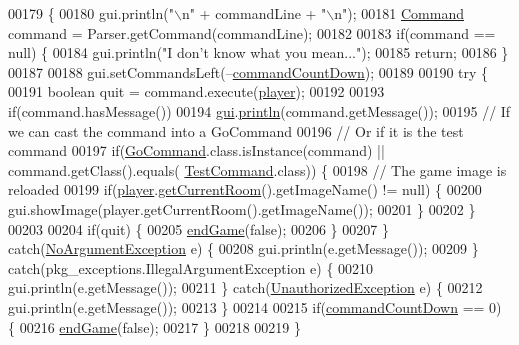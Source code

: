 \begin{DoxyCode}
00179                                                    \{
00180         gui.println(\textcolor{stringliteral}{"\(\backslash\)n"} + commandLine + \textcolor{stringliteral}{"\(\backslash\)n"});
00181         \hyperlink{classpkg__commands_1_1Command}{Command} command = Parser.getCommand(commandLine);
00182 
00183         \textcolor{keywordflow}{if}(command == null) \{
00184             gui.println(\textcolor{stringliteral}{"I don't know what you mean..."});
00185             \textcolor{keywordflow}{return};
00186         \}
00187 
00188         gui.setCommandsLeft(--\hyperlink{classGameEngine_ad4ff8d760eced9c7b76cdeb0dc989975}{commandCountDown});
00189 
00190         \textcolor{keywordflow}{try} \{
00191             \textcolor{keywordtype}{boolean} quit = command.execute(\hyperlink{classGameEngine_a4666c6719428cc43014b30b305eeef5d}{player});
00192 
00193             \textcolor{keywordflow}{if}(command.hasMessage())
00194                 \hyperlink{classGameEngine_a2a7d0bb6183b3f3ef3ee2008926374a0}{gui}.\hyperlink{classUserInterface_a79f606b4b1f5d1523e50eea00039ed94}{println}(command.getMessage());
00195             \textcolor{comment}{// If we can cast the command into a GoCommand}
00196             \textcolor{comment}{// Or if it is the test command}
00197             \textcolor{keywordflow}{if}(\hyperlink{classpkg__commands_1_1GoCommand}{GoCommand}.class.isInstance(command) || command.getClass().equals(
      \hyperlink{classpkg__commands_1_1TestCommand}{TestCommand}.class)) \{
00198                 \textcolor{comment}{// The game image is reloaded}
00199                 \textcolor{keywordflow}{if}(\hyperlink{classGameEngine_a4666c6719428cc43014b30b305eeef5d}{player}.\hyperlink{classpkg__world_1_1Player_a5ff0ede152d97c0c9cf6603c9a422a77}{getCurrentRoom}().getImageName() != null) \{
00200                     gui.showImage(player.getCurrentRoom().getImageName());
00201                 \}
00202             \}
00203 
00204             \textcolor{keywordflow}{if}(quit) \{
00205                 \hyperlink{classGameEngine_a1f5fa36c5dfc36c9a963fe439afc057b}{endGame}(\textcolor{keyword}{false});
00206             \}
00207         \} \textcolor{keywordflow}{catch}(\hyperlink{classpkg__exceptions_1_1NoArgumentException}{NoArgumentException} e) \{
00208             gui.println(e.getMessage());
00209         \} \textcolor{keywordflow}{catch}(pkg\_exceptions.IllegalArgumentException e) \{
00210             gui.println(e.getMessage());
00211         \} \textcolor{keywordflow}{catch}(\hyperlink{classpkg__exceptions_1_1UnauthorizedException}{UnauthorizedException} e) \{
00212             gui.println(e.getMessage());
00213         \}
00214 
00215         \textcolor{keywordflow}{if}(\hyperlink{classGameEngine_ad4ff8d760eced9c7b76cdeb0dc989975}{commandCountDown} == 0) \{
00216             \hyperlink{classGameEngine_a1f5fa36c5dfc36c9a963fe439afc057b}{endGame}(\textcolor{keyword}{false});
00217         \}
00218 
00219     \}
\end{DoxyCode}


